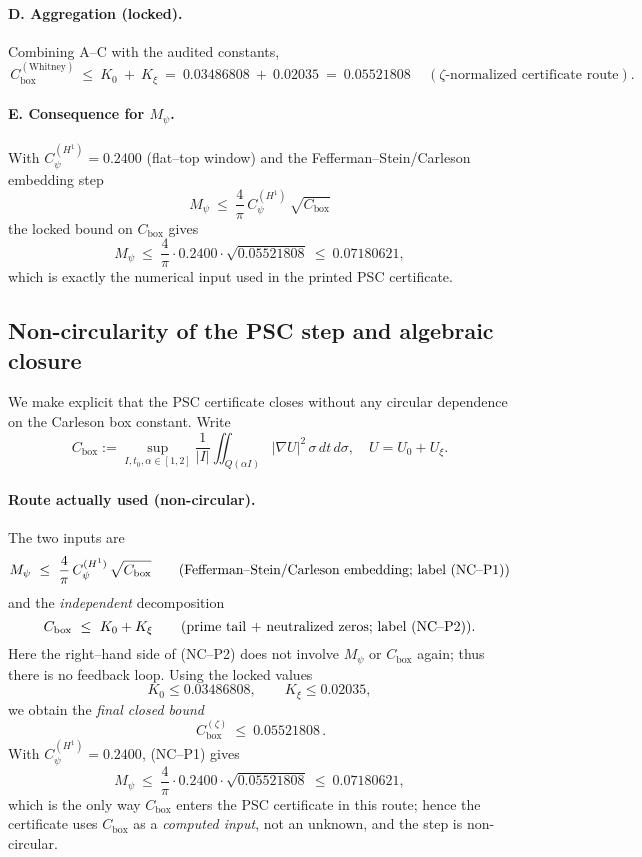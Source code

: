 \documentclass[11pt]{article}
\providecommand{\CboxZeta}{0.05521808}%
\providecommand{\Mpsilocked}{0.07180621}%
\theoremstyle{definition}
\theoremstyle{remark}
\begin{document}
\paragraph{D. Aggregation (locked).}
Combining A–C with the audited constants,
\[
\boxed{\,C_{\mathrm{box}}^{(\mathrm{Whitney})}\ \le\ K_0\ +\ K_\xi\ =\ 0.03486808\ +\ 0.02035\ =\ \CboxZeta\,}\quad(\zeta\text{-normalized certificate route}).
\]
\paragraph{E. Consequence for $M_\psi$.}
With $C_\psi^{(H^1)}=0.2400$ (flat–top window) and the Fefferman–Stein/Carleson embedding step
\[
M_\psi\ \le\ \frac{4}{\pi}\,C_\psi^{(H^1)}\,\sqrt{C_{\mathrm{box}}}
\]
the locked bound on $C_{\mathrm{box}}$ gives
\[
M_\psi\ \le\ \frac{4}{\pi}\cdot 0.2400\cdot \sqrt{0.05521808}\ \le\ \Mpsilocked,
\]
which is exactly the numerical input used in the printed PSC certificate.
\subsection*{Non-circularity of the PSC step and algebraic closure}
We make explicit that the PSC certificate closes without any circular dependence on the
Carleson box constant. Write
\[
C_{\mathrm{box}}
:=\sup_{I,t_0,\alpha\in[1,2]}
\frac{1}{|I|}\iint_{Q(\alpha I)} |\nabla U|^2\,\sigma\,dt\,d\sigma,
\quad
U=U_0+U_\xi.
\]
\paragraph{Route actually used (non-circular).}
The two inputs are
\[
M_\psi\ \le\ \frac{4}{\pi}\,C_\psi^{(H^1)}\,\sqrt{C_{\mathrm{box}}}
\qquad\text{(Fefferman--Stein/Carleson embedding; label {\rm (NC--P1)})}
\]
and the \emph{independent} decomposition
\[
C_{\mathrm{box}}\ \le\ K_0+K_\xi\qquad\text{(prime tail + neutralized zeros; label {\rm (NC--P2)})}.
\]
Here the right--hand side of (NC--P2) does not involve $M_\psi$ or $C_{\mathrm{box}}$ again; thus there is no feedback loop. Using the locked values
\[
K_0\le 0.03486808,\qquad K_\xi\le 0.02035,
\]
we obtain the \emph{final closed bound}
\[
\boxed{\,C_{\mathrm{box}}^{(\zeta)}\ \le\ 0.05521808\,}.
\]
With $C_\psi^{(H^1)}=0.2400$, (NC--P1) gives
\[
M_\psi\ \le\ \frac{4}{\pi}\cdot 0.2400\cdot \sqrt{0.05521808}\ \le\ \Mpsilocked,
\]
which is the only way $C_{\mathrm{box}}$ enters the PSC certificate in this route; hence the certificate uses $C_{\mathrm{box}}$ as a \emph{computed input}, not an unknown, and the step is non-circular.
\end{document}
